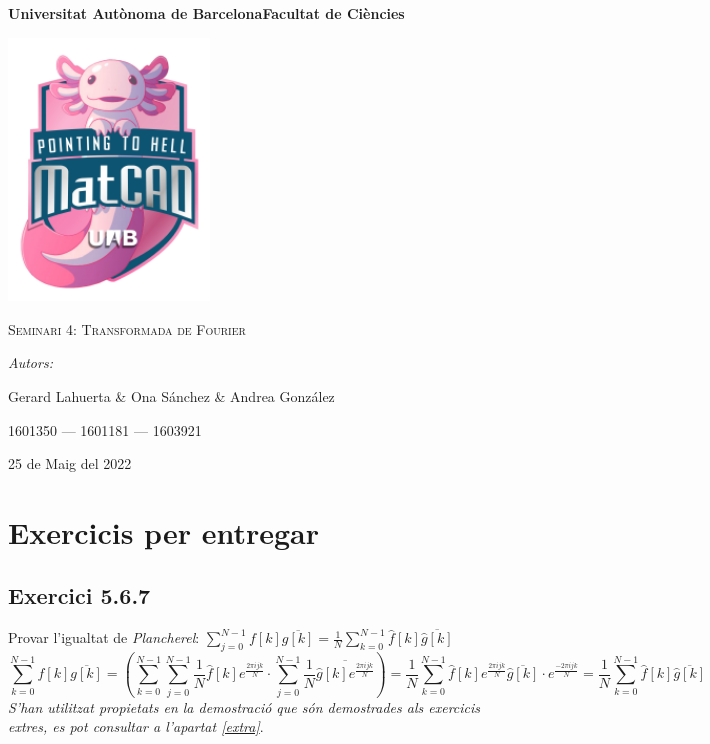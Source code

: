 \documentclass[a4paper, 11pt]{article}
\begin{document}
\begin{titlepage}
    \centering
    {\bfseries\LARGE \hspace{2em} Universitat Autònoma de Barcelona\newline Facultat de Ciències\par}
    \vspace{2cm}
    {\hspace{-1em}\includegraphics[width=0.4\textwidth]{logo.png}\par}
    \vspace{1cm}
    {\scshape\Huge Seminari 4: Transformada de Fourier\par} 
    \vspace{1cm}
    {\Large \itshape Autors: \par}
    {\Large  Gerard Lahuerta \& Ona Sánchez \& Andrea González \par}
    {\Large 1601350 --- 1601181 --- 1603921 \par}
    \vspace{1cm}
    {\Large 25 de Maig del 2022\par}
\end{titlepage}

\justifying

\newpage
\setcounter{page}{2}
\pagestyle{plain}
\tableofcontents
\cleardoublepage
{}
\newpage
\section{Exercicis per entregar}
\subsection{Exercici 5.6.7}
Provar l'igualtat de \textit{Plancherel}: $\sum_{j = 0}^{N-1} f[k]\overline{g[k]} = \frac{1}{N} \sum_{k = 0}^{N-1} \hat{f}[k] \overline{\hat{g}[k]}$
$$\sum_{k = 0}^{N-1} f[k]\overline{g[k]} = \left( \sum_{k = 0}^{N-1} \sum_{j = 0}^{N-1}\frac{1}{N} \hat{f}[k] e^{\frac{2\pi i j k}{N}} \cdot \sum_{j = 0}^{N-1} \frac{1}{N} \overline{\hat{g}[k] e^{\frac{2\pi i j k}{N}}}\right) = \frac{1}{N}  \sum_{k = 0}^{N-1} \hat{f}[k] e^{\frac{2\pi i j k}{N}} \overline{\hat{g}[k]} \cdot e^{\frac{-2\pi i j k}{N}} = \frac{1}{N} \sum_{k = 0}^{N-1} \hat{f}[k] \overline{\hat{g}[k]}$$
\textit{S'han utilitzat propietats en la demostració que són demostrades als exercicis extres, es  pot consultar a l'apartat \textcolor{blue}{\ref{extra}}}.
\end{document}
